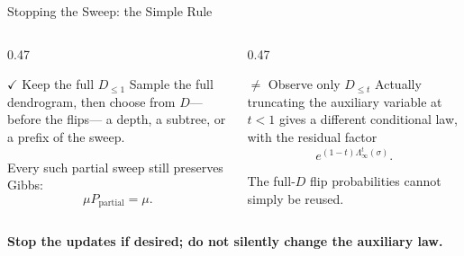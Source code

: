 \begin{frame}{Stopping the Sweep: the Simple Rule}
  \begin{columns}[onlytextwidth,c]
    \begin{column}{0.47\textwidth}
      \begin{block}{\Large $\checkmark$ Keep the full $D_{\leq1}$}
        Sample the full dendrogram, then choose from $D$---before the flips---
        a depth, a subtree, or a prefix of the sweep.

        \vspace{0.5em}
        Every such partial sweep still preserves Gibbs:
        \[
          \boxed{\ \mu P_{\mathrm{partial}}=\mu.\ }
        \]
      \end{block}
    \end{column}

    \begin{column}{0.47\textwidth}
      \begin{alertblock}{\Large $\boldsymbol{\neq}$ Observe only $D_{\leq t}$}
        Actually truncating the auxiliary variable at $t<1$ gives a different
        conditional law, with the residual factor
        \[
          \boxed{\ e^{(1-t)\Lambda_\infty^t(\sigma)}.\ }
        \]

        The full-$D$ flip probabilities cannot simply be reused.
      \end{alertblock}
    \end{column}
  \end{columns}

  \begin{center}
    \textbf{Stop the updates if desired; do not silently change the auxiliary law.}
  \end{center}
\end{frame}

